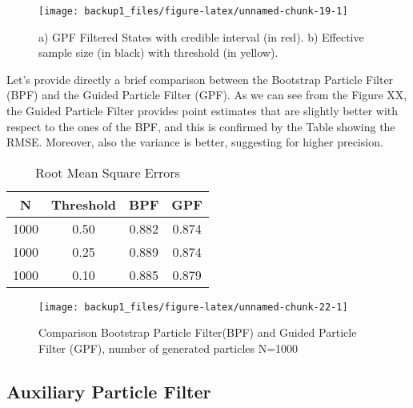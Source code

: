 \documentclass[
]{book}
\theoremstyle{break}
\theoremstyle{nonumberplain}
\begin{document}
\begin{figure}[H]

{\centering \texttt{[image: backup1\_files/figure-latex/unnamed-chunk-19-1]} 

}

\caption{a) GPF Filtered States with credible interval (in red). b) Effective sample size (in black) with threshold (in yellow).}\label{fig:unnamed-chunk-19}
\end{figure}

Let's provide directly a brief comparison between the Bootstrap Particle
Filter (BPF) and the Guided Particle Filter (GPF). As we can see from
the Figure XX, the Guided Particle Filter provides point estimates that
are slightly better with respect to the ones of the BPF, and this is
confirmed by the Table showing the RMSE. Moreover, also the variance is
better, suggesting for higher precision.

\begin{longtable}[t]{cccc}
\caption{\label{tab:unnamed-chunk-21}Root Mean Square Errors}\\
\toprule
N & Threshold & BPF & GPF\\
\midrule
1000 & 0.50 & 0.882 & 0.874\\
1000 & 0.25 & 0.889 & 0.874\\
1000 & 0.10 & 0.885 & 0.879\\
\bottomrule
\end{longtable}

\begin{figure}[H]

{\centering \texttt{[image: backup1\_files/figure-latex/unnamed-chunk-22-1]} 

}

\caption{Comparison Bootstrap Particle Filter(BPF) and Guided Particle Filter (GPF), number of generated particles N=1000}\label{fig:unnamed-chunk-22}
\end{figure}

\subsection{Auxiliary Particle Filter}
\end{document}
